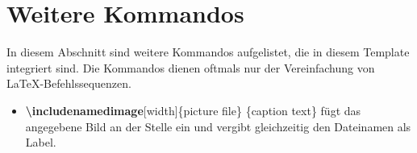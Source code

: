 %
\section{Weitere Kommandos}\label{sec:addCommands}
In diesem Abschnitt sind weitere Kommandos aufgelistet, die in diesem Template integriert sind. Die Kommandos dienen oftmals nur der Vereinfachung von \LaTeX-Be\-fehls\-se\-quenzen.

\begin{itemize}
\item \textbf{\textbackslash includenamedimage}[width]\{picture file\} \{caption text\} fügt das angegebene Bild an der Stelle ein und vergibt gleichzeitig den Dateinamen als Label.
\end{itemize}
